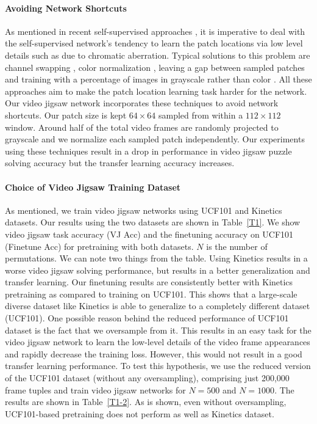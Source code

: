 \documentclass[10pt,twocolumn,letterpaper]{article}
\begin{document}
\vspace{-3mm}
\paragraph{\textbf{Avoiding Network Shortcuts}}
As mentioned in recent self-supervised approaches \cite{doersch2015unsupervised,noroozi2016unsupervised,noroozi2017representation}, it is imperative to deal with the self-supervised network's tendency to learn the patch locations via low level details such as due to chromatic aberration. Typical solutions to this problem are channel swapping \cite{lee2017unsupervised}, color normalization \cite{noroozi2016unsupervised}, leaving a gap between sampled patches and training with a percentage of images in grayscale rather than color \cite{noroozi2017representation}. All these approaches aim to make the patch location learning task harder for the network. Our video jigsaw network incorporates these techniques to avoid network shortcuts. Our patch size is kept $64 \times 64$ sampled from within a $112 \times 112$ window. Around half of the total video frames are randomly projected to grayscale and we normalize each sampled patch independently. Our experiments using these techniques result in a drop in performance in video jigsaw puzzle solving accuracy but the transfer learning accuracy increases.

\vspace{-3mm}
\paragraph{\textbf{Choice of Video Jigsaw Training Dataset}}
As mentioned, we train video jigsaw networks using UCF101 and Kinetics datasets. Our results using the two datasets are shown in Table~\ref{T1}. We show video jigsaw task accuracy (VJ Acc) and the finetuning accuracy on UCF101 (Finetune Acc) for pretraining with both datasets. $N$ is the number of permutations. We can note two things from the table. Using Kinetics results in a worse video jigsaw solving performance, but results in a better generalization and transfer learning. Our finetuning results are consistently better with Kinetics pretraining as compared to training on UCF101. This shows that a large-scale diverse dataset like Kinetics is able to generalize to a completely different dataset (UCF101). One possible reason behind the reduced performance of UCF101 dataset is the fact that we oversample from it. This results in an easy task for the video jigsaw network to learn the low-level details of the video frame appearances and rapidly decrease the training loss. However, this would not result in a good transfer learning performance. To test this hypothesis, we use the reduced version of the UCF101 dataset (without any oversampling), comprising just 200,000 frame tuples and train video jigsaw networks for $N = 500$ and $N = 1000$. The results are shown in Table~\ref{T1-2}. As is shown, even without oversampling, UCF101-based pretraining does not perform as well as Kinetics dataset. 
\end{document}
